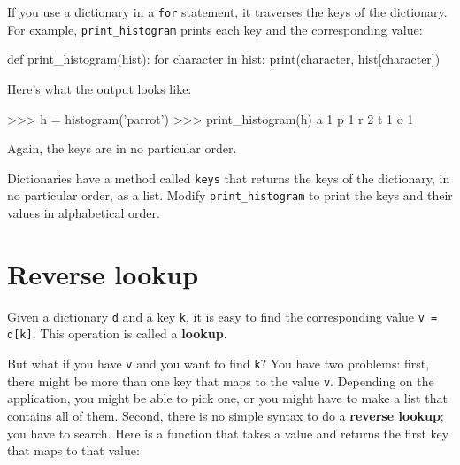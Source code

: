 
If you use a dictionary in a {\tt for} statement, it traverses
the keys of the dictionary.  For example, \verb"print_histogram"
prints each key and the corresponding value:

\beforeverb
\begin{pycode}
def print_histogram(hist):
    for character in hist:
        print(character, hist[character])
\end{pycode}
\afterverb
%
Here's what the output looks like:

\beforeverb
\begin{pyinterpreter}
>>> h = histogram('parrot')
>>> print_histogram(h)
a 1
p 1
r 2
t 1
o 1
\end{pyinterpreter}
\afterverb
%
Again, the keys are in no particular order.

\begin{exercise}


Dictionaries have a method called {\tt keys} that returns
the keys of the dictionary, in no particular order, as a list.
%
Modify \verb"print_histogram" to print the keys and their values
in alphabetical order.
\end{exercise}



\section{Reverse lookup}


Given a dictionary {\tt d} and a key {\tt k}, it is easy to
find the corresponding value {\tt v = d[k]}.  This operation
is called a {\bf lookup}.

But what if you have {\tt v} and you want to find {\tt k}?
You have two problems: first, there might be more than one
key that maps to the value {\tt v}.  Depending on the application,
you might be able to pick one, or you might have to make
a list that contains all of them.  Second, there is no
simple syntax to do a {\bf reverse lookup}; you have to search.
%
Here is a function that takes a value and returns the first
key that maps to that value:

